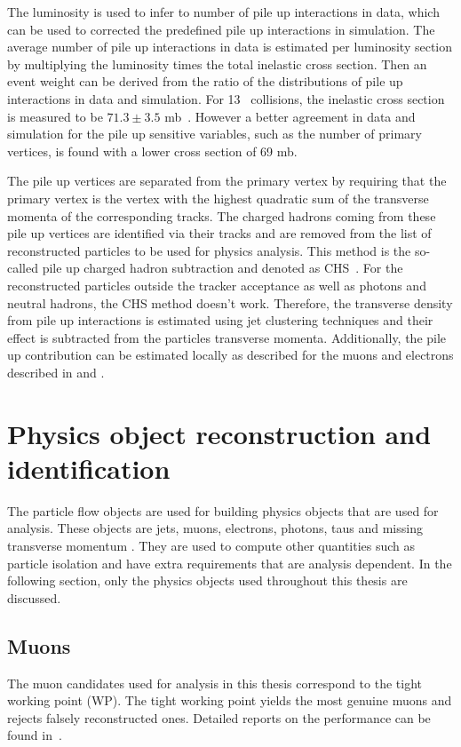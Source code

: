 The luminosity is used to infer to number of pile up interactions in data, which can be used to corrected the predefined pile up interactions in simulation. The average number of pile up interactions in data is estimated per luminosity section by multiplying the luminosity times the total inelastic cross section. Then an event weight can be derived from the ratio of the distributions of pile up interactions in data and simulation. For 13 \TeV\ collisions, the inelastic cross section is measured to be $71.3\pm3.5$ mb~\cite{CMS-PAS-LUM-17-001}. However a better agreement in data and simulation for the pile up sensitive variables, such as the number of primary vertices, is found with a lower cross section of 69 mb.

The pile up vertices are separated from the primary vertex by requiring that the primary vertex is the vertex with the highest quadratic sum of the transverse momenta of the corresponding tracks. The charged hadrons coming from these pile up vertices are identified via their tracks and are removed from the list of reconstructed particles to be used for physics analysis. This method is the so-called pile up charged hadron subtraction and denoted as CHS~\cite{CMS-PAS-JME-14-001}. For the reconstructed particles outside the tracker acceptance as well as photons and neutral hadrons, the CHS method doesn't work. Therefore, the transverse density from pile up interactions is estimated using jet clustering techniques and their effect is subtracted from the particles transverse momenta. Additionally, the pile up contribution can be estimated locally as described for the muons and electrons described in  and . 



\section{Physics object reconstruction and identification}
\label{sec:PhysicsObject}
The particle flow objects are used for building physics objects that are used for analysis. These objects are jets, muons, electrons, photons, taus and missing transverse momentum \ptmisvec. They are used to compute other quantities such as particle isolation and have extra requirements that are analysis dependent. In the following section, only the physics objects used throughout this thesis are discussed. 

\subsection{Muons}
\label{sec:MuonID}
The muon candidates used for analysis in this thesis correspond to the tight  working point (WP). The tight working point yields the most genuine muons and rejects falsely reconstructed ones. Detailed reports on the performance can be found in~\cite{CMS-DP-2017-007}.

